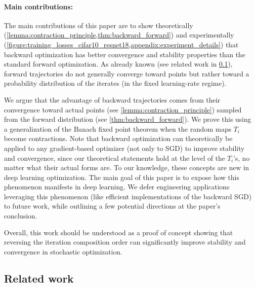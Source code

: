 \documentclass[10pt]{article} %
\theoremstyle{plain}
\theoremstyle{definition}
\theoremstyle{remark}
\begin{document}
\paragraph{Main contributions:} The main contributions of this paper are to show theoretically (\cref{lemma:contraction_principle,thm:backward_forward}) and experimentally (\cref{figure:training_losses_cifar10_resnet18,appendix:experiment_details}) that backward optimization has better convergence and stability properties than the standard forward optimization. As already known (see related work in \cref{section:related_work}), forward trajectories do not generally converge toward points but rather toward a probability distribution of the iterates (in the fixed learning-rate regime). 

We argue that the advantage of backward trajectories comes from their convergence toward actual points (see \cref{lemma:contraction_principle}) sampled from the forward distribution (see \cref{thm:backward_forward}).
We prove this using a generalization of the Banach fixed point theorem when the random maps $T_i$ become contractions. 
Note that backward optimization can theoretically be applied to any gradient-based optimizer (not only to SGD) to improve stability and convergence, since our theoretical statements hold at the level of the $T_i$'s, no matter what their actual forms are. 
To our knowledge, these concepts are new in deep learning optimization.
The main goal of this paper is to expose how this phenomenon manifests in deep learning. We defer engineering applications leveraging this phenomenon (like efficient implementations of the backward SGD) to future work, while outlining a few potential directions at the paper's conclusion.

Overall, this work should be understood as a proof of concept showing that reversing the iteration composition order can significantly improve stability and convergence in stochastic optimization.



\subsection{Related work}\label{section:related_work}
\end{document}
